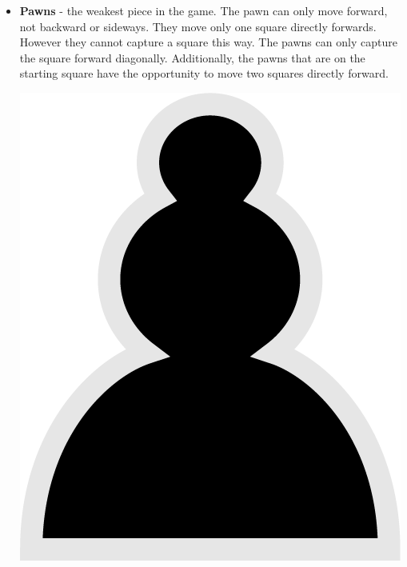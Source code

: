 \documentclass{article}
\begin{document}
\begin{itemize}
\begin{center}
    \end{center}
    
    \item \textbf{Pawns} - the weakest piece in the game. The pawn can only move forward, not backward or sideways. They move only one square directly forwards. However they cannot capture a square this way. The pawns can only capture the square forward diagonally. Additionally, the pawns that are on the starting square have the opportunity to move two squares directly forward.\\
    \begin{center}
    	\includegraphics[scale=0.1]{image2.png}

\end{center}
\end{itemize}
\end{document}
